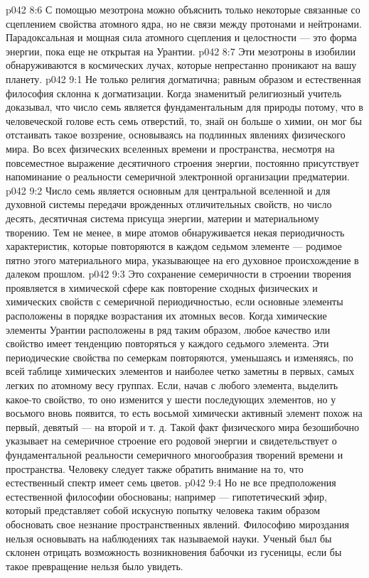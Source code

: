 \vs p042 8:6 С помощью мезотрона можно объяснить только некоторые связанные со сцеплением свойства атомного ядра, но не связи между протонами и нейтронами. Парадоксальная и мощная сила атомного сцепления и целостности --- это форма энергии, пока еще не открытая на Урантии.
\vs p042 8:7 Эти мезотроны в изобилии обнаруживаются в космических лучах, которые непрестанно проникают на вашу планету.
\vs p042 9:1 Не только религия догматична; равным образом и естественная философия склонна к догматизации. Когда знаменитый религиозный учитель доказывал, что число семь является фундаментальным для природы потому, что в человеческой голове есть семь отверстий, то, знай он больше о химии, он мог бы отстаивать такое воззрение, основываясь на подлинных явлениях физического мира. Во всех физических вселенных времени и пространства, несмотря на повсеместное выражение десятичного строения энергии, постоянно присутствует напоминание о реальности семеричной электронной организации предматерии.
\vs p042 9:2 Число семь является основным для центральной вселенной и для духовной системы передачи врожденных отличительных свойств, но число десять, десятичная система присуща энергии, материи и материальному творению. Тем не менее, в мире атомов обнаруживается некая периодичность характеристик, которые повторяются в каждом седьмом элементе --- родимое пятно этого материального мира, указывающее на его духовное происхождение в далеком прошлом.
\vs p042 9:3 Это сохранение семеричности в строении творения проявляется в химической сфере как повторение сходных физических и химических свойств с семеричной периодичностью, если основные элементы расположены в порядке возрастания их атомных весов. Когда химические элементы Урантии расположены в ряд таким образом, любое качество или свойство имеет тенденцию повторяться у каждого седьмого элемента. Эти периодические свойства по семеркам повторяются, уменьшаясь и изменяясь, по всей таблице химических элементов и наиболее четко заметны в первых, самых легких по атомному весу группах. Если, начав с любого элемента, выделить какое\hyp{}то свойство, то оно изменится у шести последующих элементов, но у восьмого вновь появится, то есть восьмой химически активный элемент похож на первый, девятый --- на второй и т. д. Такой факт физического мира безошибочно указывает на семеричное строение его родовой энергии и свидетельствует о фундаментальной реальности семеричного многообразия творений времени и пространства. Человеку следует также обратить внимание на то, что естественный спектр имеет семь цветов.
\vs p042 9:4 Но не все предположения естественной философии обоснованы; например --- гипотетический эфир, который представляет собой искусную попытку человека таким образом обосновать свое незнание пространственных явлений. Философию мироздания нельзя основывать на наблюдениях так называемой науки. Ученый был бы склонен отрицать возможность возникновения бабочки из гусеницы, если бы такое превращение нельзя было увидеть.
